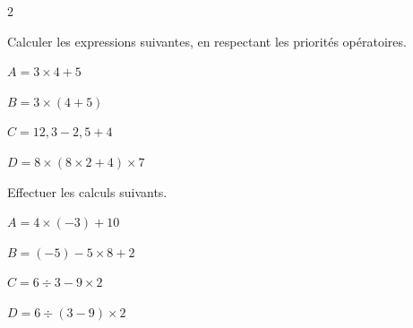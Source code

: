 \begin{multicols}{2}
\begin{exercice}{}{}
    Calculer les expressions suivantes, en respectant les priorités opératoires.
    \begin{enumeratebf}
        \item $A=3\times 4+5$
        \item $B=3\times (4+5)$
        \item $C=12,3-2,5+4$
        \item $D=8\times (8\times 2+4)\times 7$
    \end{enumeratebf}
\end{exercice}

\begin{exercice}{}{}
    Effectuer les calculs suivants.

    \begin{enumeratebf}
        \item $A=4\times (-3)+10$
        \item $B=(-5)-5\times 8+2$
        \item $C=6÷3-9\times 2$
        \item $D=6÷(3-9)\times 2$
    \end{enumeratebf}

\end{exercice}

\end{multicols}